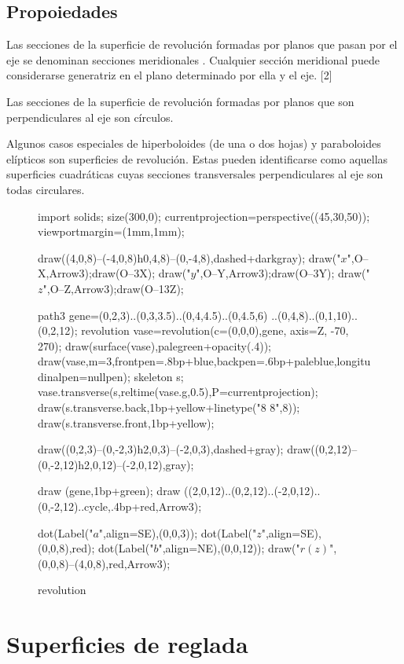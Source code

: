 \documentclass[a4paper]{book}
\begin{document}
\subsection{Propoiedades}

Las secciones de la superficie de revolución formadas por planos que pasan por el eje se denominan secciones meridionales . Cualquier sección meridional puede considerarse generatriz en el plano determinado por ella y el eje. [2]

Las secciones de la superficie de revolución formadas por planos que son perpendiculares al eje son círculos.

Algunos casos especiales de hiperboloides (de una o dos hojas) y paraboloides elípticos son superficies de revolución. Estas pueden identificarse como aquellas superficies cuadráticas cuyas secciones transversales perpendiculares al eje son todas circulares.

\begin{figure}[!ht]\centering
	\begin{asy}
	import solids;
	size(300,0);
	currentprojection=perspective((45,30,50));
	viewportmargin=(1mm,1mm);

	draw((4,0,8)--(-4,0,8)^^(0,4,8)--(0,-4,8),dashed+darkgray);
	draw("$x$",O--X,Arrow3);draw(O--3X);
	draw("$y$",O--Y,Arrow3);draw(O--3Y);
	draw("$z$",O--Z,Arrow3);draw(O--13Z);

	path3 gene=(0,2,3)..(0,3,3.5)..(0,4,4.5)..(0,4.5,6)
	..(0,4,8)..(0,1,10)..(0,2,12);
	revolution vase=revolution(c=(0,0,0),gene, axis=Z, -70, 270);
	draw(surface(vase),palegreen+opacity(.4));
	draw(vase,m=3,frontpen=.8bp+blue,backpen=.6bp+paleblue,longitudinalpen=nullpen);
	skeleton s;
	vase.transverse(s,reltime(vase.g,0.5),P=currentprojection);
	draw(s.transverse.back,1bp+yellow+linetype("8 8",8));
	draw(s.transverse.front,1bp+yellow);

	draw((0,2,3)--(0,-2,3)^^(2,0,3)--(-2,0,3),dashed+gray);
	draw((0,2,12)--(0,-2,12)^^(2,0,12)--(-2,0,12),gray);

	draw (gene,1bp+green);
	draw ((2,0,12)..(0,2,12)..(-2,0,12)..(0,-2,12)..cycle,.4bp+red,Arrow3);

	dot(Label("$a$",align=SE),(0,0,3));
	dot(Label("$z$",align=SE),(0,0,8),red);
	dot(Label("$b$",align=NE),(0,0,12));
	draw("$r(z)$",(0,0,8)--(4,0,8),red,Arrow3);

	\end{asy}
	\caption{revolution}\end{figure}
 \section{Superficies de reglada}
\end{document}
